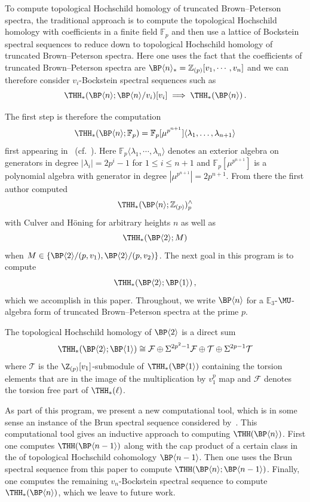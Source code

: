 To compute topological Hochschild homology of truncated Brown--Peterson spectra, the traditional approach is to compute the topological Hochschild homology with coefficients in a finite field $\mathbb{F}_p$ and then use a lattice of Bockstein spectral sequences to reduce down to topological Hochschild homology of truncated Brown--Peterson spectra. Here one uses the fact that the coefficients of truncated Brown--Peterson spectra are $\BP\langle n\rangle_*=\mathbb{Z}_{(p)}[v_1,\cdots ,v_n]$ and we can therefore consider $v_i$-Bockstein spectral sequences such as 
\[ 
\THH_*(\BP\langle n\rangle;\BP\langle n\rangle/v_i)[v_i]\implies \THH_*(\BP\langle n\rangle)\,.
\]

The first step is therefore the computation 
\[ \THH_*(\BP\langle n\rangle;\mathbb{F}_p)=\mathbb{F}_p[\mu^{p^{n+1}}]\langle \lambda_1,\dots ,\lambda_{n+1} \rangle
\]
first appearing in~\cite{ACH24} (cf.~\cite{Ang26}). Here  $\mathbb{F}_p\langle \lambda_1,\cdots ,\lambda_n\rangle$ denotes an exterior algebra on generators in degree $|\lambda_{i}|=2p^i-1$ for $1\le i\le n+1$ and $\mathbb{F}_p[\mu^{p^{n+1}}]$ is a polynomial algebra with generator in degree $|\mu^{p^{n+1}}|=2p^{n+1}$. From there the first author computed 
\[ \THH_*(\BP\langle n\rangle ; \mathbb{Z}_{(p)})_p^{\wedge}\]
with Culver and H\"oning for arbitrary heights $n$ as well as 
\[ \THH_*(\BP\langle 2\rangle ; M)\]
when $M\in \{\BP\langle 2\rangle/(p,v_1),\BP\langle 2\rangle /(p,v_2)\}$. The next goal in this program is to compute 
\[ \THH_*(\BP\langle 2\rangle;\BP\langle 1\rangle) \,,
\]
which we accomplish in this paper. Throughout, we write $\BP\langle n\rangle$ for a $\mathbb{E}_3$-$\MU$-algebra form of truncated Brown--Peterson spectra at the prime $p$. 
\begin{thmx}\label{thm:main}
  The topological Hochschild homology of $\BP\langle 2\rangle$ is a direct sum
  \begin{equation}
    \THH_*(\BP \langle 2 \rangle ; \BP \langle 1 \rangle) \cong \mathcal{F}\oplus \Sigma^{2p^2-1}\mathcal{F} \oplus \mathcal{T} \oplus \Sigma^{2p - 1} \mathcal{T}
  \end{equation}
  where $\mathcal{T}$ is the $\Z_{(p)}[v_1]$-submodule of $\THH_*(\BP \langle 1 \rangle)$ containing the torsion elements that are in the image of the multiplication by $v_1^p$ map and $\mathcal{F}$ denotes the torsion free part of $\THH_*(\ell)$. 
\end{thmx}

As part of this program, we present a new computational tool, which is in some sense an instance of the Brun spectral sequence considered by~\cites{Bru00,Hon20}. This computational tool gives an inductive approach to computing $\THH(\BP\langle n\rangle)$. First one computes $\THH(\BP\langle n-1\rangle)$ along with the cap product of a certain class in the of topological Hochschild cohomology $\BP\langle n-1\rangle$. Then one uses the Brun spectral sequence from this paper to compute $\THH(\BP\langle n\rangle;\BP\langle n-1\rangle)$.  Finally, one computes the remaining $v_{n}$-Bockstein spectral sequence to compute $\THH_*(\BP\langle n\rangle)$, which we leave to future work. 

